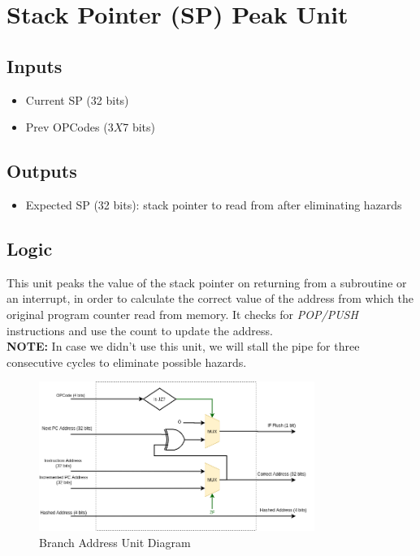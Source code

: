 \documentclass[12pt]{report}
\begin{document}
\section{Stack Pointer (SP) Peak Unit}

\subsection{Inputs}
\begin{itemize}
    \item Current SP (32 bits)
    \item Prev OPCodes (3$X$7 bits)
\end{itemize}

\subsection{Outputs}
\begin{itemize}
    \item Expected SP (32 bits): stack pointer to read from after eliminating hazards
\end{itemize}

\subsection{Logic}
This unit peaks the value of the stack pointer on returning from a subroutine or an interrupt, in order to calculate the correct value of the address from which the original program counter read from memory. It checks for \emph{POP/PUSH} instructions and use the count to update the address.\\
\textbf{NOTE:} In case we didn't use this unit, we will stall the pipe for three consecutive cycles to eliminate possible hazards.

\begin{center}
    \begin{figure}[hp]
        \centering
        \includegraphics[width=0.8\textwidth]{bau}
        \caption{Branch Address Unit Diagram}
        \label{fig:bau}
    \end{figure}
\end{center}
\end{document}

